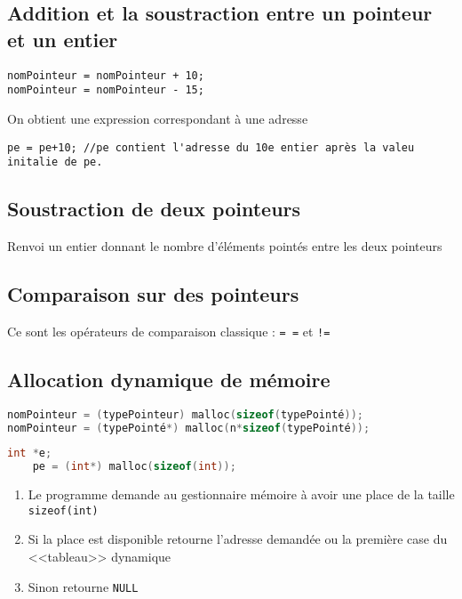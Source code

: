 \subsection{Addition et la soustraction entre un pointeur et un entier}
\begin{verbatim}
nomPointeur = nomPointeur + 10; 
nomPointeur = nomPointeur - 15; 
\end{verbatim}
On obtient une expression correspondant à une adresse
\begin{verbatim}
pe = pe+10; //pe contient l'adresse du 10e entier après la valeu initalie de pe.
\end{verbatim}

\subsection{Soustraction de deux pointeurs}
Renvoi un entier donnant le nombre d'éléments pointés entre les deux pointeurs

\subsection{Comparaison sur des pointeurs}
Ce sont les opérateurs de comparaison classique : \texttt{= =} et \texttt{!=}

\subsection{Allocation dynamique de mémoire}
\begin{lstlisting}[language=C, numbers=none,frame=none, caption=Syntaxe d'allocation dynamique]
nomPointeur = (typePointeur) malloc(sizeof(typePointé));
nomPointeur = (typePointé*) malloc(n*sizeof(typePointé));
\end{lstlisting}
\begin{lstlisting}[language=C, numbers=none,frame=none, caption=Exemple d'allocation dynamique]
	int *e;
	pe = (int*) malloc(sizeof(int));
\end{lstlisting}
\begin{enumerate}
	\item Le programme demande au gestionnaire mémoire à avoir une place de la taille \texttt{sizeof(int)}
	\item Si la place est disponible retourne l'adresse demandée ou la première case du <<tableau>> dynamique
	\item Sinon retourne \texttt{NULL}
\end{enumerate}

